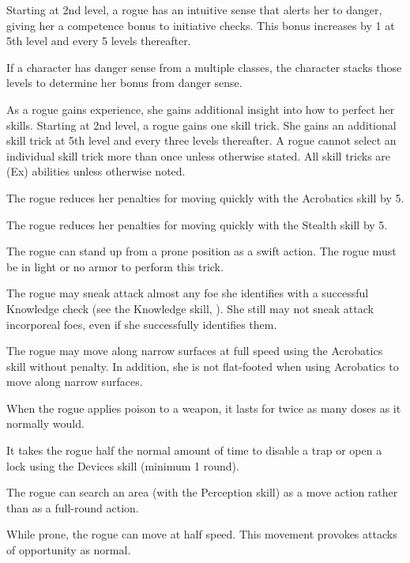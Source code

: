  Starting at 2nd level, a rogue has an intuitive sense that alerts her to danger, giving her a  competence bonus to initiative checks. This bonus increases by 1 at 5th level and every 5 levels thereafter.
\par If a character has danger sense from a multiple classes, the character stacks those levels to determine her bonus from danger sense.

 As a rogue gains experience, she gains additional insight into how to perfect her skills. Starting at 2nd level, a rogue gains one skill trick. She gains an additional skill trick at 5th level and every three levels thereafter. A rogue cannot select an individual skill trick more than once unless otherwise stated. All skill tricks are (Ex) abilities unless otherwise noted.

 The rogue reduces her penalties for moving quickly with the Acrobatics skill by 5.

 The rogue reduces her penalties for moving quickly with the Stealth skill by 5.

 The rogue can stand up from a prone position as a swift action. The rogue must be in light or no armor to perform this trick.

 The rogue may sneak attack almost any foe she identifies with a successful Knowledge check (see the Knowledge skill, ). She still may not sneak attack incorporeal foes, even if she successfully identifies them.

 The rogue may move along narrow surfaces at full speed using the Acrobatics skill without penalty. In addition, she is not flat-footed when using Acrobatics to move along narrow surfaces.

 When the rogue applies poison to a weapon, it lasts for twice as many doses as it normally would.

 It takes the rogue half the normal amount of time to disable a trap or open a lock using the Devices skill (minimum 1 round).

 The rogue can search an area (with the Perception skill) as a move action rather than as a full-round action.

 While prone, the rogue can move at half speed. This movement provokes attacks of opportunity as normal.

